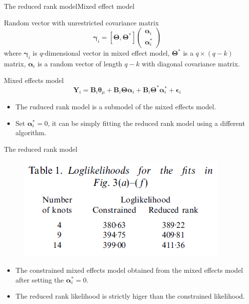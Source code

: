 \documentclass{beamer}
\def \bY {\mathbf{Y}}
\def \btheta {\boldsymbol{\theta}}
\def \bTheta {\boldsymbol{\Theta}}
\def \bepsilon {\boldsymbol{\epsilon}}
\def \balpha {\boldsymbol{\alpha}}
\def \bgamma {\boldsymbol{\gamma}}
\begin{document}
\begin{frame}{The reduced rank model}{Mixed effect model}
	\begin{block}{Random vector with unrestricted covariance matrix}
		$$ \bgamma_i = [\bTheta, \bTheta^*]
						\begin{pmatrix}
							\balpha_i\\
							\balpha^*_i
						\end{pmatrix}
		$$
		where $\bgamma_i$ is $q$-dimensional vector in mixed effect model, $\bTheta^*$ is a $q \times (q-k)$ matrix, $\balpha_i$ is a random vector of length $q-k$ with diagonal covariance matrix.
	\end{block}	
	\begin{block}{Mixed effects model}
		$$ \bY_i=\mathbf{B}_i\btheta_{\mu}+\mathbf{B}_i\bTheta\balpha_i + \mathbf{B}_i\bTheta^*\balpha^*_i + \bepsilon_i $$
	\end{block}	
	\begin{itemize}
		\item {
			The ruduced rank model is a submodel of the mixed effects model.
		}
		\item {
			Set $\balpha^*_i=0$, it can be simply fitting the reduced rank model using a different algorithm.
		}
	\end{itemize}
\end{frame}

\begin{frame}{The reduced rank model}
	\begin{figure}[h] %
		\begin{center}
			\includegraphics[width=0.7\linewidth]{img/4.png}
		\end{center}
		\label{fig:long}
		\label{fig:onecol}
	\end{figure}
	\begin{itemize}
		\item {
			The constrained mixed effects model obtained from the mixed effects model after setting the $\balpha^*_i=0$.
		}
		\item {
			The reduced rank likelihood is strictly higer than the constrained likelihood.
		}
	\end{itemize}
\end{frame}
\end{document}
